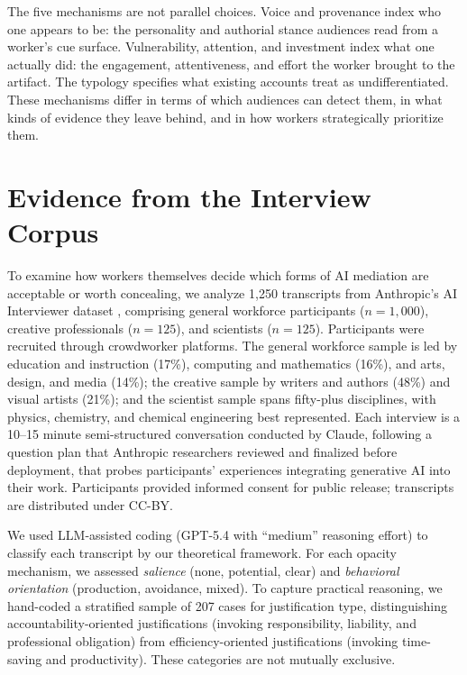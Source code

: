\documentclass[pdflatex,sn-basic]{sn-jnl}%
\theoremstyle{thmstyleone}%
\theoremstyle{thmstyletwo}%
\theoremstyle{thmstylethree}%
\begin{document}
The five mechanisms are not parallel choices. Voice and provenance index who one appears to be: the personality and authorial stance audiences read from a worker's cue surface. Vulnerability, attention, and investment index what one actually did: the engagement, attentiveness, and effort the worker brought to the artifact. The typology specifies what existing accounts treat as undifferentiated. These mechanisms differ in terms of which audiences can detect them, in what kinds of evidence they leave behind, and in how workers strategically prioritize them. 

\section{Evidence from the Interview Corpus}

To examine how workers themselves decide which forms of AI mediation are acceptable or worth concealing, we analyze 1,250 transcripts from Anthropic's AI Interviewer dataset \citep{anthropic2025interviewer}, comprising general workforce participants ($n = 1{,}000$), creative professionals ($n = 125$), and scientists ($n = 125$). Participants were recruited through crowdworker platforms. The general workforce sample is led by education and instruction (17\%), computing and mathematics (16\%), and arts, design, and media (14\%); the creative sample by writers and authors (48\%) and visual artists (21\%); and the scientist sample spans fifty-plus disciplines, with physics, chemistry, and chemical engineering best represented. Each interview is a 10--15 minute semi-structured conversation conducted by Claude, following a question plan that Anthropic researchers reviewed and finalized before deployment, that probes participants' experiences integrating generative AI into their work. Participants provided informed consent for public release; transcripts are distributed under CC-BY.

We used LLM-assisted coding (GPT-5.4 with ``medium'' reasoning effort) to classify each transcript by our theoretical framework. For each opacity mechanism, we assessed \textit{salience} (none, potential, clear) and \textit{behavioral orientation} (production, avoidance, mixed). To capture practical reasoning, we hand-coded a stratified sample of 207 cases for justification type, distinguishing accountability-oriented justifications (invoking responsibility, liability, and professional obligation) from efficiency-oriented justifications (invoking time-saving and productivity). These categories are not mutually exclusive.
\end{document}
